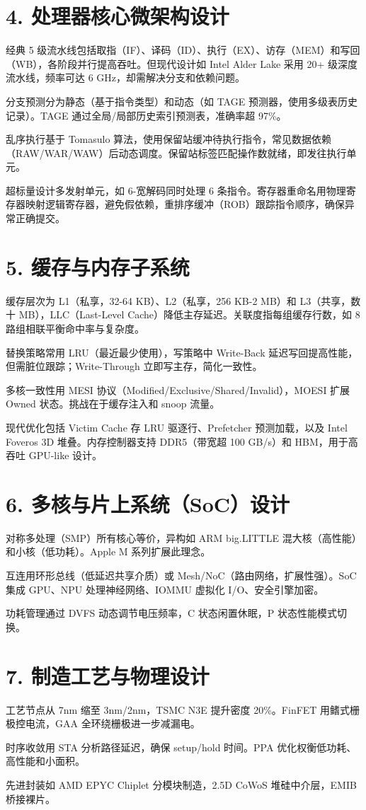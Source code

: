 \chapter{4. 处理器核心微架构设计}
经典 5 级流水线包括取指（IF）、译码（ID）、执行（EX）、访存（MEM）和写回（WB），各阶段并行提高吞吐。但现代设计如 Intel Alder Lake 采用 20+ 级深度流水线，频率可达 6 GHz，却需解决分支和依赖问题。\par
分支预测分为静态（基于指令类型）和动态（如 TAGE 预测器，使用多级表历史记录）。TAGE 通过全局/局部历史索引预测表，准确率超 97\%{}。\par
乱序执行基于 Tomasulo 算法，使用保留站缓冲待执行指令，常见数据依赖（RAW/WAR/WAW）后动态调度。保留站标签匹配操作数就绪，即发往执行单元。\par
超标量设计多发射单元，如 6-宽解码同时处理 6 条指令。寄存器重命名用物理寄存器映射逻辑寄存器，避免假依赖，重排序缓冲（ROB）跟踪指令顺序，确保异常正确提交。\par
\chapter{5. 缓存与内存子系统}
缓存层次为 L1（私享，32-64 KB）、L2（私享，256 KB-2 MB）和 L3（共享，数十 MB），LLC（Last-Level Cache）降低主存延迟。关联度指每组缓存行数，如 8 路组相联平衡命中率与复杂度。\par
替换策略常用 LRU（最近最少使用），写策略中 Write-Back 延迟写回提高性能，但需脏位跟踪；Write-Through 立即写主存，简化一致性。\par
多核一致性用 MESI 协议（Modified/Exclusive/Shared/Invalid），MOESI 扩展 Owned 状态。挑战在于缓存注入和 snoop 流量。\par
现代优化包括 Victim Cache 存 LRU 驱逐行、Prefetcher 预测加载，以及 Intel Foveros 3D 堆叠。内存控制器支持 DDR5（带宽超 100 GB/s）和 HBM，用于高吞吐 GPU-like 设计。\par
\chapter{6. 多核与片上系统（SoC）设计}
对称多处理（SMP）所有核心等价，异构如 ARM big.LITTLE 混大核（高性能）和小核（低功耗）。Apple M 系列扩展此理念。\par
互连用环形总线（低延迟共享介质）或 Mesh/NoC（路由网络，扩展性强）。SoC 集成 GPU、NPU 处理神经网络、IOMMU 虚拟化 I/O、安全引擎加密。\par
功耗管理通过 DVFS 动态调节电压频率，C 状态闲置休眠，P 状态性能模式切换。\par
\chapter{7. 制造工艺与物理设计}
工艺节点从 7nm 缩至 3nm/2nm，TSMC N3E 提升密度 20\%{}。FinFET 用鳍式栅极控电流，GAA 全环绕栅极进一步减漏电。\par
时序收敛用 STA 分析路径延迟，确保 setup/hold 时间。PPA 优化权衡低功耗、高性能和小面积。\par
先进封装如 AMD EPYC Chiplet 分模块制造，2.5D CoWoS 堆硅中介层，EMIB 桥接裸片。\par
